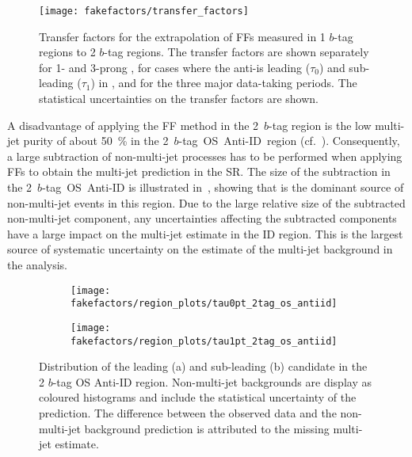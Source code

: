 \begin{figure}[htbp]
  \centering

  \texttt{[image: fakefactors/transfer\_factors]}

  \caption[Transfer factors for the extrapolation of FFs measured in 1 $b$-tag
  regions to 2 $b$-tag regions.]{Transfer factors for the extrapolation of FFs
    measured in 1 $b$-tag regions to 2 $b$-tag regions. The transfer factors are
    shown separately for 1- and 3-prong \tauhadvis, for cases where the
    anti-\tauhadvis is leading ($\tau_0$) and sub-leading ($\tau_1$) in \pT, and
    for the three major data-taking periods.  The statistical uncertainties on
    the transfer factors are shown.}%
  \label{fig:mjfakes_transfer_factor}
\end{figure}

A disadvantage of applying the FF method in the 2~$b$-tag region is the low
multi-jet purity of about \SI{50}{\percent} in the 2~$b$-tag~OS~Anti-ID~region
(cf.\ ). Consequently, a large subtraction of
non-multi-jet processes has to be performed when applying FFs to obtain the
multi-jet prediction in the SR.  The size of the subtraction in the
2~$b$-tag~OS~Anti-ID is illustrated in~,
showing that \ttbarFakes is the dominant source of non-multi-jet events in this
region. Due to the large relative size of the subtracted non-multi-jet
component, any uncertainties affecting the subtracted components have a large
impact on the multi-jet estimate in the ID region. This is the largest source of
systematic uncertainty on the estimate of the multi-jet background in the
analysis.

\begin{figure}[htbp]
  \centering

  \begin{subfigure}{0.49\textwidth}
    \texttt{[image: fakefactors/region\_plots/tau0pt\_2tag\_os\_antiid]}
    \subcaption{}
  \end{subfigure}%
  \begin{subfigure}{0.49\textwidth}
    \texttt{[image: fakefactors/region\_plots/tau1pt\_2tag\_os\_antiid]}
    \subcaption{}
  \end{subfigure}

  \caption[Distribution of the leading and sub-leading \tauhadvis candidate \pT
  in the 2 $b$-tag OS Anti-ID region.]{Distribution of the leading (a) and
    sub-leading (b) \tauhadvis candidate \pT in the 2 $b$-tag OS Anti-ID
    region. Non-multi-jet backgrounds are display as coloured histograms and
    include the statistical uncertainty of the prediction. The difference
    between the observed data and the non-multi-jet background prediction is
    attributed to the missing multi-jet estimate.}%
  \label{fig:mjfakes_2tag_os_antiid}
\end{figure}


